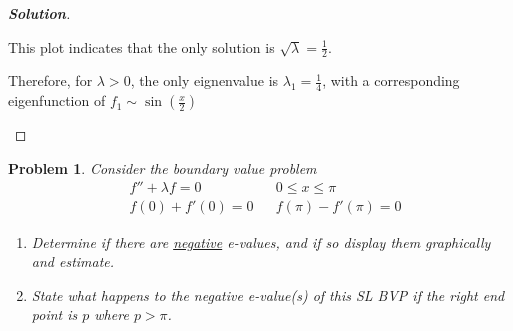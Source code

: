 \documentclass[a4paper,12pt]{article} %
\theoremstyle{plain}
\newtheorem{problem}{Problem}
\begin{document}
\begin{proof}[\textbf{Solution}]
\begin{enumerate}[label=\alph*.)]
    \begin{center}
    \end{center}
    This plot indicates that the only solution is $\sqrt \lambda = \frac{1}{2}$.
    
    Therefore, for $\lambda > 0$, the only eignenvalue is $\lambda_1 = \frac{1}{4}$, with a corresponding eigenfunction of $f_1 \sim \sin \left( \frac{x}{2} \right)$
    
\end{enumerate}
\end{proof}


\begin{problem} %
    Consider the boundary value problem
    \begin{align*}
    &f'' + \lambda f = 0 &  &0 \leq x \leq \pi \\
    &f(0) + f'(0) = 0 && f(\pi) -f'(\pi) = 0
    \end{align*}
    
    \begin{enumerate}[label=\alph*.)]
        \item Determine if there are \underline{negative} e-values, and if so display them graphically and estimate.
        \item State what happens to the negative e-value(s) of this SL BVP if the right end point is $p$ where $p>\pi$.
    \end{enumerate}
\end{problem}
\end{document}
